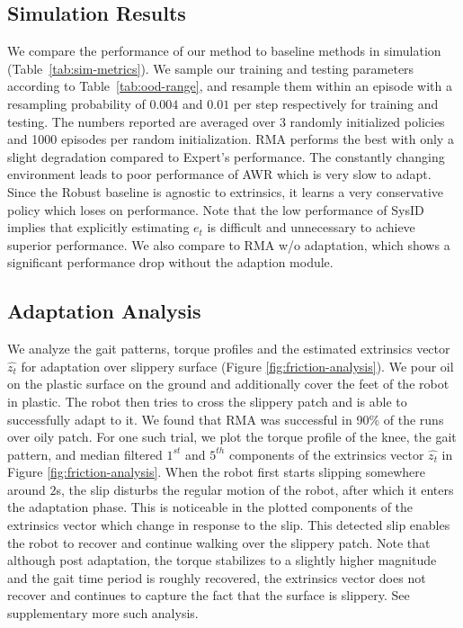 \documentclass[conference]{IEEEtran}
\newcommand{\algo}{RMA}
\newcommand{\pagelink}{https://ashish-kmr.github.io/rma-legged-robots/}
\begin{document}
\subsection{Simulation Results}
We compare the performance of our method to baseline methods in simulation (Table~\ref{tab:sim-metrics}). We sample our training and testing parameters according to Table~\ref{tab:ood-range}, and resample them within an episode with a resampling probability of $0.004$ and $0.01$ per step respectively for training and testing. The numbers reported are averaged over 3 randomly initialized policies and 1000 episodes per random initialization. \algo{} performs the best with only a slight degradation compared to Expert's performance. The constantly changing environment leads to poor performance of AWR which is very slow to adapt. Since the Robust baseline is agnostic to extrinsics, it learns a very conservative policy which loses on performance. Note that the low performance of SysID implies that explicitly estimating $e_t$ is difficult and unnecessary to achieve superior performance. We also compare to \algo{} w/o adaptation, which shows a significant performance drop without the adaption module. 

\subsection{Adaptation Analysis}
We analyze the gait patterns, torque profiles and the estimated extrinsics vector $\hat{z_t}$ for adaptation over slippery surface (Figure \ref{fig:friction-analysis}). We pour oil on the plastic surface on the ground and additionally cover the feet of the robot in plastic. The robot then tries to cross the slippery patch and is able to successfully adapt to it. We found that \algo{} was successful in 90\% of the runs over oily patch. For one such trial, we plot the torque profile of the knee, the gait pattern, and median filtered $1^{st}$ and $5^{th}$ components of the extrinsics vector $\hat{z_t}$ in Figure \ref{fig:friction-analysis}. When the robot first starts slipping somewhere around $2$s, the slip disturbs the regular motion of the robot, after which it enters the adaptation phase. This is noticeable in the plotted components of the extrinsics vector which change in response to the slip. This detected slip enables the robot to recover and continue walking over the slippery patch. Note that although post adaptation, the torque stabilizes to a slightly higher magnitude and the gait time period is roughly recovered, the extrinsics vector does not recover and continues to capture the fact that the surface is slippery. See supplementary more such analysis. 
\end{document}
